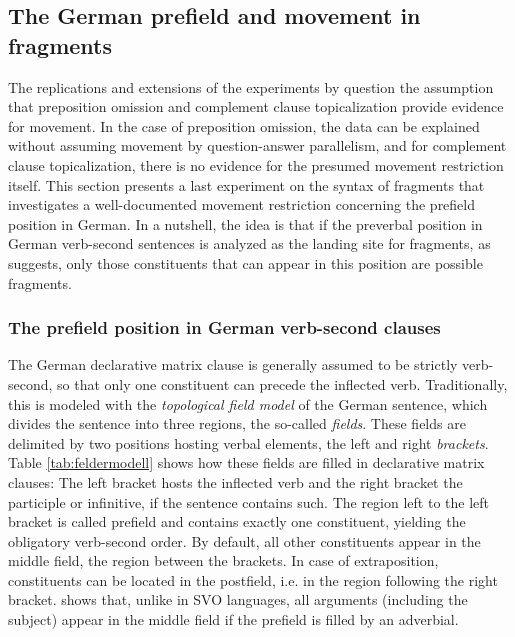 \subsection{The German prefield and movement in fragments}
The replications and extensions of the experiments by \citet{merchant.etal2013} question the assumption that preposition omission and complement clause topicalization provide evidence for movement. In the case of preposition omission, the data can be explained without assuming movement by question-answer parallelism, and for complement clause topicalization, there is no evidence for the presumed movement restriction itself. This section presents a last experiment on the syntax of fragments that investigates a well-documented movement restriction concerning the prefield position in German. In a nutshell, the idea is that if the preverbal position in German verb-second sentences is analyzed as the landing site for fragments, as \citet{merchant2004} suggests, only those constituents that can appear in this position are possible fragments.

\subsubsection{The prefield position in German verb-second clauses}
The German declarative matrix clause is generally assumed to be strictly verb-second, so that only one constituent can precede the inflected verb. Traditionally, this is modeled with the \textit{topological field model} \citep{drach1937} of the German sentence, which divides the sentence into three regions, the so-called \textit{fields}. These fields are delimited by two positions hosting verbal elements, the left and right \textit{brackets}. Table \ref{tab:feldermodell} shows how these fields are filled in declarative matrix clauses: The left bracket hosts the inflected verb and the right bracket the participle or infinitive, if the sentence contains such. The region left to the left bracket is called prefield and contains exactly one constituent, yielding the obligatory verb-second order. By default, all other constituents appear in the middle field, the region between the brackets. In case of extraposition, constituents can be located in the postfield, i.e. in the region following the right bracket. \Next shows that, unlike in SVO languages, all arguments (including the subject) appear in the middle field if the prefield is filled by an adverbial.

